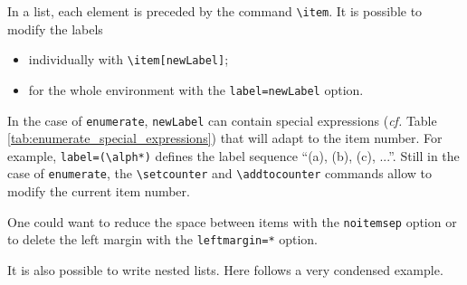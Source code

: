 \documentclass[a4paper, 12pt]{report}
\def\tbs{\textbackslash}
\begin{document}
    In a list, each element is preceded by the command \texttt{\tbs{}item}. It is possible to modify the labels
    \begin{itemize}
        \item individually with \texttt{\tbs{}item[newLabel]};
        \item for the whole environment with the \texttt{label=newLabel} option.
    \end{itemize}

    In the case of \texttt{enumerate}, \texttt{newLabel} can contain special expressions (\emph{cf.} Table \ref{tab:enumerate_special_expressions}) that will adapt to the item number. For example, \texttt{label=(\tbs{}alph*)} defines the label sequence \enquote{(a), (b), (c), ...}. Still in the case of \texttt{enumerate}, the  \texttt{\tbs{}setcounter} and \texttt{\tbs{}addtocounter} commands allow to modify the current item number.

    One could want to reduce the space between items with the \texttt{noitemsep} option or to delete the left margin with the \texttt{leftmargin=*} option.

    It is also possible to write nested lists. Here follows a very condensed example.
\end{document}
